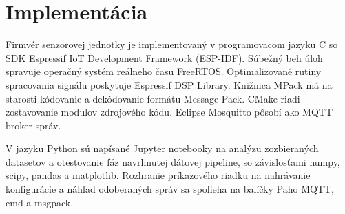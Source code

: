 \chapter{Implementácia} \label{chapter:implementation}
Firmvér senzorovej jednotky je implementovaný v programovacom jazyku C so
SDK Espressif IoT Development Framework (ESP-IDF). Súbežný beh úloh spravuje operačný systém reálneho času FreeRTOS.
Optimalizované rutiny spracovania signálu poskytuje Espressif DSP Library. Knižnica MPack má na starosti
kódovanie a dekódovanie formátu Message Pack. CMake riadi zostavovanie
modulov zdrojového kódu. Eclipse Mosquitto pôsobí ako MQTT broker správ.

V jazyku Python sú napísané Jupyter notebooky na analýzu zozbieraných datasetov a otestovanie fáz navrhnutej dátovej pipeline,
so závislosťami numpy, scipy, pandas a matplotlib. Rozhranie príkazového riadku na nahrávanie konfigurácie a náhľad odoberaných
správ sa spolieha na balíčky Paho MQTT, cmd a msgpack.

